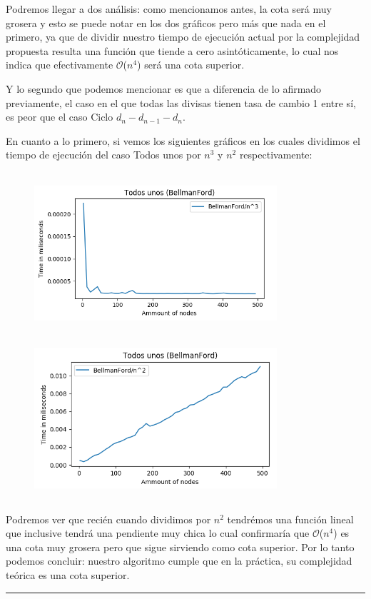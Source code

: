 \documentclass[11pt,a4paper]{article}
\begin{document}
Podremos llegar a dos an\'alisis: como mencionamos antes, la cota ser\'a muy grosera y esto se puede notar en los dos gr\'aficos pero m\'as que nada en el primero, ya que de dividir nuestro tiempo de ejecuci\'on actual por la complejidad propuesta resulta una funci\'on que tiende a cero asint\'oticamente, lo cual nos indica que efectivamente $\mathcal{O}$($n^{4}$) ser\'a una cota superior.

Y lo segundo que podemos mencionar es que a diferencia de lo afirmado previamente, el caso en el que todas las divisas tienen tasa de cambio 1 entre s\'i, es peor que el caso Ciclo $d_{n}-d_{n-1}-d_{n}$.

En cuanto a lo primero, si vemos los siguientes gr\'aficos en los cuales dividimos el tiempo de ejecuci\'on del caso Todos unos por $n^{3}$ y $n^{2}$ respectivamente:

\begin{figure}[h]
    \includegraphics[height = 6cm,width = 9cm]{BF3-unos.png}
    \includegraphics[height = 6cm,width = 9cm]{BF2-unos.png}
\end{figure}

Podremos ver que reci\'en cuando dividimos por $n^{2}$ tendr\'emos una funci\'on lineal que inclusive tendr\'a una pendiente muy chica lo cual confirmar\'ia que $\mathcal{O}$($n^{4}$) es una cota muy grosera pero que sigue sirviendo como cota superior.
Por lo tanto podemos concluir: nuestro algoritmo cumple que en la pr\'actica, su complejidad te\'orica es una cota superior.
\\
\begin{center}
  \rule{100mm}{0.1mm}  
\end{center}
\end{document}
